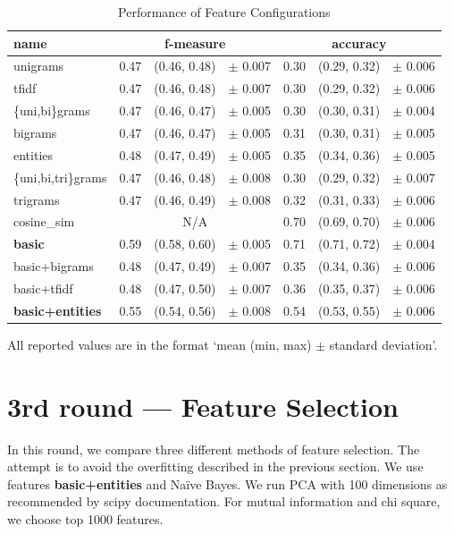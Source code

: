 \begin{table}[h!]

\centering
\begin{tabular}{lr@{~}r@{~}rr@{~}r@{~}r}
\toprule
\textbf{name}	& \multicolumn{3}{c}{\textbf{f-measure}} & \multicolumn{3}{c}{\textbf{accuracy}} \\
\midrule
unigrams& 0.47 & (0.46, 0.48) & $\pm$ 0.007 & 0.30 & (0.29, 0.32) & $\pm$ 0.006 \\
tfidf& 0.47 & (0.46, 0.48) & $\pm$ 0.007 & 0.30 & (0.29, 0.32) & $\pm$ 0.006 \\
\{uni,bi\}grams	& 0.47 & (0.46, 0.47) & $\pm$ 0.005 & 0.30 & (0.30, 0.31) & $\pm$ 0.004\\
bigrams & 0.47 & (0.46, 0.47) & $\pm$ 0.005 & 0.31 & (0.30, 0.31) & $\pm$ 0.005			\\
entities & 0.48 & (0.47, 0.49) & $\pm$ 0.005 & 0.35 & (0.34, 0.36) & $\pm$ 0.005		\\
\{uni,bi,tri\}grams & 0.47 & (0.46, 0.48) & $\pm$ 0.008 & 0.30 & (0.29, 0.32) & $\pm$ 0.007	\\
trigrams & 0.47 & (0.46, 0.49) & $\pm$ 0.008 & 0.32 & (0.31, 0.33) & $\pm$ 0.006		\\
cosine\_sim & \multicolumn{3}{c}{N/A} & 0.70 & (0.69, 0.70) & $\pm$ 0.006		\\
\textbf{basic} & 0.59 & (0.58, 0.60) & $\pm$ 0.005 & 0.71 & (0.71, 0.72) & $\pm$ 0.004		\\
basic+bigrams & 0.48 & (0.47, 0.49) & $\pm$ 0.007 & 0.35 & (0.34, 0.36) & $\pm$ 0.006		\\
basic+tfidf & 0.48 & (0.47, 0.50) & $\pm$ 0.007 & 0.36 & (0.35, 0.37) & $\pm$ 0.006			\\
\textbf{basic+entities} & 0.55 & (0.54, 0.56) & $\pm$ 0.008 & 0.54 & (0.53, 0.55) & $\pm$ 0.006		\\
\bottomrule
\end{tabular}


\caption{Performance of Feature Configurations}\label{tab:feat_perf}
All reported values are in the format `mean (min, max) $\pm$ standard deviation'.
\end{table}


\section{3rd round --- Feature Selection}

In this round, we compare three different methods of feature selection.
The attempt is to avoid the overfitting described in the previous section.
We use features \textbf{basic+entities} and Na\"{i}ve Bayes.
We run PCA with 100 dimensions as recommended by scipy documentation.
For mutual information and chi square, we choose top 1000 features.


